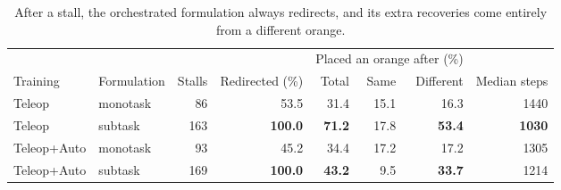 \begin{table}[H]
    \centering
    \caption{After a stall, the orchestrated formulation always redirects, and its extra recoveries come entirely from a different orange.}
    \label{tab:level2_deadline}
    \small
    \begin{tabular}{llrrrrrr}
        \toprule
        & & & & \multicolumn{3}{c}{Placed an orange after (\%)} & \\
        \cmidrule(lr){5-7}
        Training & Formulation & Stalls & Redirected (\%) & Total & Same & Different & Median steps \\
        \midrule
        Teleop      & monotask & 86  & 53.5           & 31.4          & 15.1 & 16.3          & 1440 \\
        Teleop      & subtask  & 163 & \textbf{100.0} & \textbf{71.2} & 17.8 & \textbf{53.4} & \textbf{1030} \\
        Teleop+Auto & monotask & 93  & 45.2           & 34.4          & 17.2 & 17.2          & 1305 \\
        Teleop+Auto & subtask  & 169 & \textbf{100.0} & \textbf{43.2} & 9.5  & \textbf{33.7} & 1214 \\
        \bottomrule
    \end{tabular}
\end{table}


